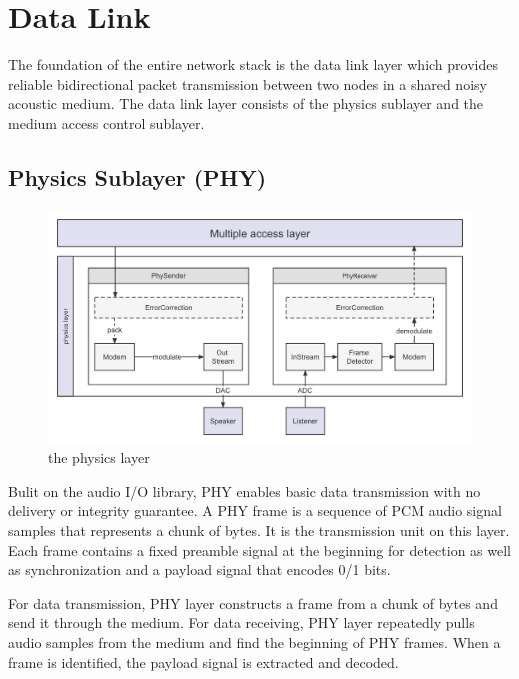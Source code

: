 \section{Data Link}
The foundation of the entire network stack is the data link layer which
provides reliable bidirectional packet transmission between two nodes in a shared noisy acoustic medium.
The data link layer consists of the physics sublayer and the medium access control sublayer.

\subsection{Physics Sublayer (PHY)}
\begin{figure}[h]
	\begin{center}
		\centerline{\includegraphics[width=\columnwidth]{./figures/Phylayer.png}}
		\caption{the physics layer}
		\label{physics}
	\end{center}
\end{figure}
Bulit on the audio I/O library, PHY enables basic data transmission with no delivery or integrity guarantee.
A PHY frame is a sequence of PCM audio signal samples that represents a chunk of bytes. It is the transmission unit on this layer.
Each frame contains a fixed preamble signal at the beginning for detection as well as synchronization and a payload signal that encodes 0/1 bits.\par
For data transmission, PHY layer constructs a frame from a chunk of bytes and send it through the medium.
For data receiving, PHY layer repeatedly pulls audio samples from the medium and find the beginning of PHY frames.
When a frame is identified, the payload signal is extracted and decoded.
